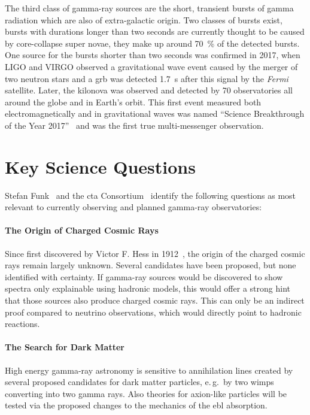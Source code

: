 The third class of gamma-ray sources are the short, transient bursts of gamma radiation
which are also of extra-galactic origin.
Two classes of bursts exist, bursts with durations longer than two seconds are
currently thought to be caused by core-collapse super novae, they make up around \SI{70}{\percent}
of the detected bursts.
One source for the bursts shorter than two seconds was confirmed in 2017, 
when LIGO and VIRGO observed a gravitational wave event caused by the merger of two 
neutron stars and a \gls{grb} was detected \SI{1.7}{\second} after this signal by the \textit{Fermi} satellite. 
Later, the kilonova was observed and detected by 70 observatories all around the globe
and in Earth's orbit. 
This first event measured both electromagnetically and in gravitational waves
was named \enquote{Science Breakthrough of the Year 2017}~\cite{neutron-star-merger}
and was the first true multi-messenger observation.

\section{Key Science Questions}\label{sec:science}

Stefan Funk~\cite{funk-gamma} and the \gls{cta} Consortium~\cite{science-cta} identify the following
questions as most relevant to currently observing and planned gamma-ray observatories:

\paragraph{The Origin of Charged Cosmic Rays}
Since first discovered by Victor F. Hess in 1912~\cite{hess1912},
the origin of the charged cosmic rays remain largely unknown.
Several candidates have been proposed, but none identified with certainty.
If gamma-ray sources would be discovered to show spectra only explainable 
using hadronic models, this would offer a strong hint that those sources also produce
charged cosmic rays.
This can only be an indirect proof compared to neutrino observations,
which would directly point to hadronic reactions.

\paragraph{The Search for Dark Matter}
High energy gamma-ray astronomy is sensitive to annihilation lines
created by several proposed candidates for dark matter particles,
e.\,g.\ by two \glspl{wimp} converting into two gamma rays.
Also theories for axion-like particles will be tested via the proposed changes to the
mechanics of the \gls{ebl} absorption.


